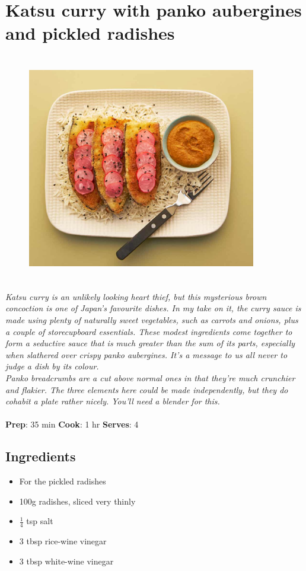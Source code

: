 \documentclass{book}
\begin{document}
\section{Katsu curry with panko aubergines and pickled radishes}
\begin{figure}
\centering\includegraphics[width=10cm,height=10cm,keepaspectratio]{Recipe_Pictures/Katsu_curry_with_panko_aubergines_and_pickled_radishes.png}
\end{figure}
\emph{Katsu curry is an unlikely looking heart thief, but this mysterious brown concoction is one of Japan’s favourite dishes. In my take on it, the curry sauce is made using plenty of naturally sweet vegetables, such as carrots and onions, plus a couple of storecupboard essentials. These modest ingredients come together to form a seductive sauce that is much greater than the sum of its parts, especially when slathered over crispy panko aubergines. It’s a message to us all never to judge a dish by its colour.\\ 
Panko breadcrumbs are a cut above normal ones in that they’re much crunchier and flakier. The three elements here could be made independently, but they do cohabit a plate rather nicely. You’ll need a blender for this.}\\\\ 
\textbf{Prep}: 35 min
\textbf{Cook}: 1 hr
\textbf{Serves}: 4
\subsection*{Ingredients}
\begin{itemize}
\item For the pickled radishes
\item 100g radishes, sliced very thinly
\item $\frac{1}{4}$ tsp salt
\item 3 tbsp rice-wine vinegar
\item 3 tbsp white-wine vinegar
\end{itemize}
\end{document}
